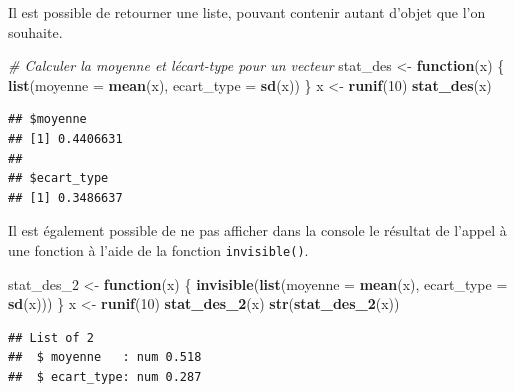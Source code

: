 \documentclass[
  11pt,
]{book}
\newenvironment{Shaded}{\begin{snugshade}}{\end{snugshade}}
\newcommand{\CommentTok}[1]{\textcolor[rgb]{0.56,0.35,0.01}{\textit{#1}}}
\newcommand{\ControlFlowTok}[1]{\textcolor[rgb]{0.13,0.29,0.53}{\textbf{#1}}}
\newcommand{\DataTypeTok}[1]{\textcolor[rgb]{0.13,0.29,0.53}{#1}}
\newcommand{\DecValTok}[1]{\textcolor[rgb]{0.00,0.00,0.81}{#1}}
\newcommand{\KeywordTok}[1]{\textcolor[rgb]{0.13,0.29,0.53}{\textbf{#1}}}
\newcommand{\NormalTok}[1]{#1}
\newcommand{\OperatorTok}[1]{\textcolor[rgb]{0.81,0.36,0.00}{\textbf{#1}}}
\newcommand{\StringTok}[1]{\textcolor[rgb]{0.31,0.60,0.02}{#1}}
\numberwithin{equation}{section}
\numberwithin{countremarque}{section}
\begin{document}
Il est possible de retourner une liste, pouvant contenir autant d'objet que l'on souhaite.

\begin{Shaded}
\begin{Highlighting}[]
\CommentTok{\# Calculer la moyenne et l\textquotesingle{}écart{-}type pour un vecteur}
\NormalTok{stat\_des \textless{}{-}}\StringTok{ }\ControlFlowTok{function}\NormalTok{(x) \{}
  \KeywordTok{list}\NormalTok{(}\DataTypeTok{moyenne =} \KeywordTok{mean}\NormalTok{(x), }\DataTypeTok{ecart\_type =} \KeywordTok{sd}\NormalTok{(x))}
\NormalTok{\}}
\NormalTok{x \textless{}{-}}\StringTok{ }\KeywordTok{runif}\NormalTok{(}\DecValTok{10}\NormalTok{)}
\KeywordTok{stat\_des}\NormalTok{(x)}
\end{Highlighting}
\end{Shaded}

\begin{lstlisting}
## $moyenne
## [1] 0.4406631
## 
## $ecart_type
## [1] 0.3486637
\end{lstlisting}

Il est également possible de ne pas afficher dans la console le résultat de l'appel à une fonction à l'aide de la fonction \texttt{invisible()}.

\begin{Shaded}
\begin{Highlighting}[]
\NormalTok{stat\_des\_}\DecValTok{2}\NormalTok{ \textless{}{-}}\StringTok{ }\ControlFlowTok{function}\NormalTok{(x) \{}
  \KeywordTok{invisible}\NormalTok{(}\KeywordTok{list}\NormalTok{(}\DataTypeTok{moyenne =} \KeywordTok{mean}\NormalTok{(x), }\DataTypeTok{ecart\_type =} \KeywordTok{sd}\NormalTok{(x)))}
\NormalTok{\}}
\NormalTok{x \textless{}{-}}\StringTok{ }\KeywordTok{runif}\NormalTok{(}\DecValTok{10}\NormalTok{)}
\KeywordTok{stat\_des\_2}\NormalTok{(x)}
\KeywordTok{str}\NormalTok{(}\KeywordTok{stat\_des\_2}\NormalTok{(x))}
\end{Highlighting}
\end{Shaded}

\begin{lstlisting}
## List of 2
##  $ moyenne   : num 0.518
##  $ ecart_type: num 0.287
\end{lstlisting}

\begin{Shaded}
\end{Shaded}
\end{document}
